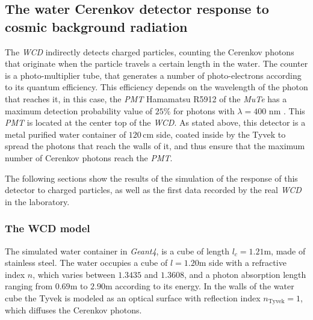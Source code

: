 \documentclass[submitting]{nst}
\begin{document}


\subsection{The water Cerenkov detector response to cosmic background radiation}\label{sec:wcd-response}
The \textsl{WCD} indirectly detects charged particles, counting the Cerenkov photons that originate when the particle travels a certain length in the water. The counter is a photo-multiplier tube, that generates a number of photo-electrons according to its quantum efficiency. This efficiency depends on the wavelength of the photon that reaches it, in this case, the \textsl{PMT} Hamamatsu R5912 of the \textsl{MuTe} has a maximum detection probability value of $25$\% for photons with $\lambda = 400$ nm \cite{Hamamatsu2018}. This \textsl{PMT} is located at the center top of the \textsl{WCD}. As stated above, this detector is a metal purified water container of $120$\,cm side, coated inside by the Tyvek to spread the photons that reach the walls of it, and thus ensure that the maximum number of Cerenkov photons reach the \textsl{PMT}. 

The following sections show the results of the simulation of the response of this detector to charged particles, as well as the first data recorded by the real \textsl{WCD} in the laboratory.


\subsubsection{The WCD model}\label{sec:wcd-model}
The simulated water container in \textsl{Geant4}, is a cube of length $l_c=1.21$m, made of stainless steel. The water occupies a cube of $ l=1.20$m side with a refractive index $n$, which varies between $1.3435$ and $1.3608$, and a photon absorption length ranging from $0.69$m to $2.90$m according to its energy. In the walls of the water cube the Tyvek is modeled as an optical surface with reflection index $n_{\mathrm{Tyvek}} = 1 $, which diffuses the Cerenkov photons.
\end{document}
